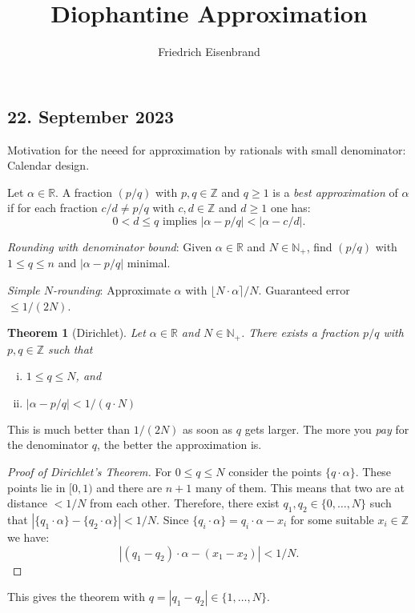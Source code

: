 \documentclass[a4paper,11pt,american]{article}
\title{Diophantine Approximation}
\author{Friedrich Eisenbrand}
\theoremstyle{plain}
\newtheorem{theorem}{Theorem}
\theoremstyle{definition}
\begin{document}
\maketitle



\subsection*{22. September 2023}

Motivation for the neeed for approximation by rationals with small denominator: Calendar design.

Let $α∈ℝ$. A fraction $(p/q)$ with $p,q ∈ℤ$ and $q≥ 1$ is a \emph{best approximation} of $α$ if for each fraction $c/d ≠ p/q$  with $c,d ∈ℤ$ and $d≥ 1$ one has:
\begin{displaymath}
  0 < d ≤ q \text{ implies } \left|α - p/q \right| < \left|α - c/d \right|. 
\end{displaymath}

\emph{Rounding with denominator bound}: Given $α ∈ ℝ$ and $N ∈ ℕ_+$, find $(p/q)$ with $1 ≤ q ≤ n$ and  $| α - p/q|$ minimal.


\emph{Simple $N$-rounding}: Approximate $α$ with $ ⌊N ⋅ α ⌉ / N$. Guaranteed error $≤ 1/(2N)$.

\begin{theorem}[Dirichlet]
  \label{thr:1}
  Let $α ∈ ℝ$ and $N ∈ ℕ_+$. There exists a fraction $p/q$ with $p,q ∈ ℤ$ such that
  \begin{enumerate}[i)]
  \item $1 ≤ q ≤N$, and
  \item $|α - p/q| < 1/(q⋅N)$ 
  \end{enumerate}
\end{theorem}
  This is much better than $1/(2N)$ as soon as $q$ gets larger. The more you \emph{pay} for the denominator $q$, the better the approximation is.

  \begin{proof}[Proof of Dirichlet's Theorem] 
    For $0 ≤ q ≤ N$ consider the points $\{q ⋅ α\}$. These points lie in $[0,1)$ and there are $n+1$ many of them. This means that two are at distance $< 1/N$ from each other. Therefore, there exist $q_1,q_2 ∈ \{0,\dots,N\}$ such that $|\{q_1 ⋅ α\} -\{q_2 ⋅ α\} | < 1/N$. Since $\{q_i ⋅ α\} = q_i ⋅ α - x_i$  for some suitable $x_i ∈ℤ$ we have:
    \begin{displaymath}
          \left| (q_1 -q_2)⋅ α - (x_1-x_2) \right| < 1/N.
    \end{displaymath}
  \end{proof}
  This gives the theorem with $q = |q_1 -q_2| ∈ \{1,\dots,N\}$. 
  
\end{document}
